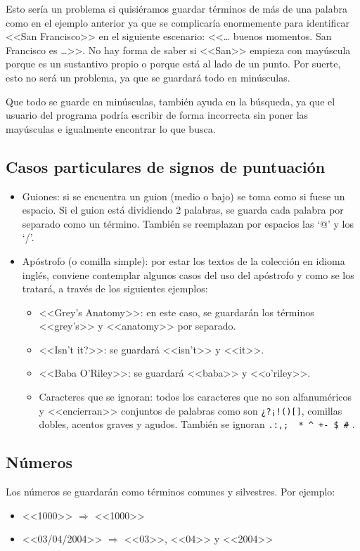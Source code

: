 Esto sería un problema si quisiéramos guardar términos de más de una palabra como en el ejemplo anterior ya que se complicaría enormemente para identificar <<San Francisco>> en el siguiente escenario: <<… buenos momentos. San Francisco es …>>. No hay forma de saber si <<San>> empieza con mayúscula porque es un sustantivo propio o porque está al lado de un punto. Por suerte, esto no será un problema, ya que se guardará todo en minúsculas.

Que todo se guarde en minúsculas, también ayuda en la búsqueda, ya que el usuario del programa podría escribir de forma incorrecta sin poner las mayúsculas e igualmente encontrar lo que busca.

 
 
\subsection{Casos particulares de signos de puntuación}
 
\begin{itemize}

\item Guiones: si se encuentra un guion (medio o bajo) se toma como si fuese un espacio. Si el guion está dividiendo 2 palabras, se guarda cada palabra por separado como un término. También se reemplazan por espacios las ‘@’ y los ‘/’.

\item Apóstrofo (o comilla simple): por estar los textos de la colección en idioma inglés, conviene contemplar algunos casos del uso del apóstrofo y como se los tratará, a través de los siguientes ejemplos:
\begin{itemize}

\item  <<Grey’s Anatomy>>: en este caso, se guardarán los términos <<grey's>> y <<anatomy>> por separado.
\item  <<Isn’t it?>>: se guardará <<isn't>> y <<it>>.
\item  <<Baba O’Riley>>:  se guardará <<baba>> y <<o'riley>>.
\item  Caracteres que se ignoran: todos los caracteres que no son alfanuméricos y <<encierran>> conjuntos de palabras como son \texttt{¿?¡!()[]{}}, comillas dobles, acentos graves y agudos.
También se ignoran \texttt{.:,;~ * \^{} +- \$ \#} .

\end{itemize}

\end{itemize}

\subsection{Números}

Los números se guardarán como términos comunes y silvestres. Por ejemplo:

\begin{itemize}
\item <<1000>> $\Longrightarrow$ <<1000>>
\item <<03/04/2004>> $\Longrightarrow$ <<03>>, <<04>> y <<2004>>
\end{itemize}
